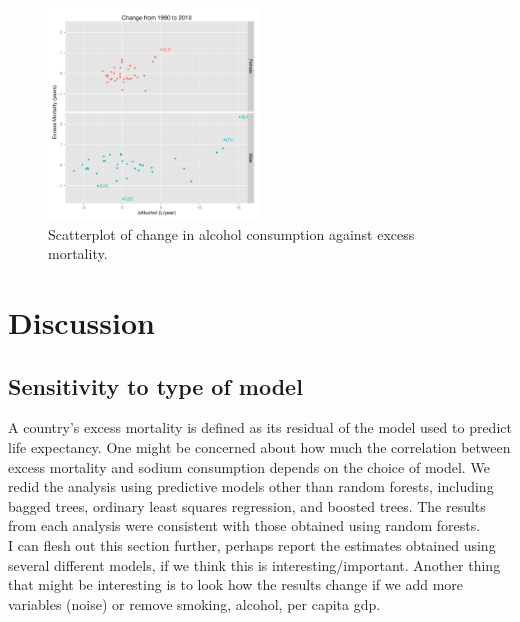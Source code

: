 \documentclass{article}
\begin{document}
\begin{figure}
\centering
\includegraphics[width = 0.5\textwidth]{etoh_exmort.pdf}
\caption{Scatterplot of change in alcohol consumption against excess mortality.}\label{fig:etoh_excessmortality}
\end{figure}


\clearpage
\section{Discussion}
\subsection{Sensitivity to type of model}
A country's excess mortality is defined as its residual of the model used to predict life expectancy.  One might be concerned about how much the correlation between excess mortality and sodium consumption depends on the choice of model.  We redid the analysis using predictive models other than random forests, including bagged trees, ordinary least squares regression, and boosted trees.  The results from each analysis were consistent with those obtained using random forests. \\

I can flesh out this section further, perhaps report the estimates obtained using several different models, if we think this is interesting/important.  Another thing that might be interesting is to look how the results change if we add more variables (noise) or remove smoking, alcohol, per capita gdp.
\end{document}
